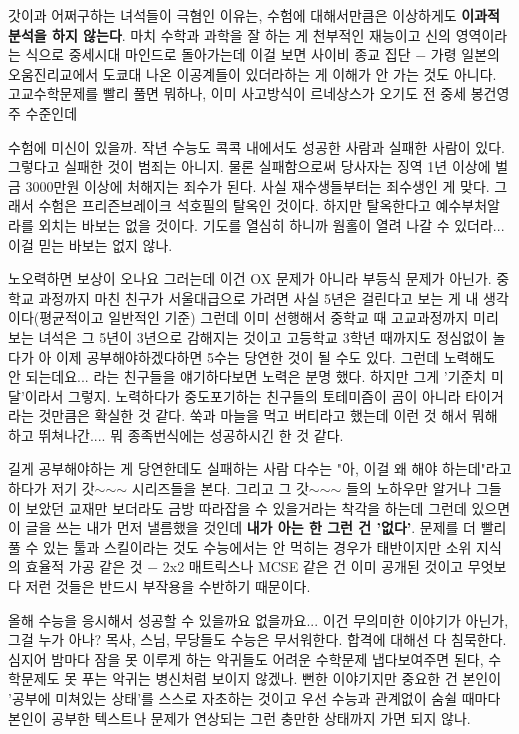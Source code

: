 갓이과 어쩌구하는 녀석들이 극혐인 이유는, 수험에 대해서만큼은 이상하게도 \textbf{이과적 분석을 하지 않는다}.
마치 수학과 과학을 잘 하는 게 천부적인 재능이고 신의 영역이라는 식으로 중세시대 마인드로 돌아가는데
이걸 보면 사이비 종교 집단 $-$ 가령 일본의 오움진리교에서 도쿄대 나온 이공계들이 있더라하는 게 이해가 안 가는 것도 아니다.
고교수학문제를 빨리 풀면 뭐하나, 이미 사고방식이 르네상스가 오기도 전 중세 봉건영주 수준인데
\vspace{5mm}

수험에 미신이 있을까.
작년 수능도 콕콕 내에서도 성공한 사람과 실패한 사람이 있다. 그렇다고 실패한 것이 범죄는 아니지.
물론 실패함으로써 당사자는 징역 1년 이상에 벌금 3000만원 이상에 처해지는 죄수가 된다.
사실 재수생들부터는 죄수생인 게 맞다. 그래서 수험은 프리즌브레이크 석호필의 탈옥인 것이다.
하지만 탈옥한다고 예수부처알라를 외치는 바보는 없을 것이다.
기도를 열심히 하니까 웜홀이 열려 나갈 수 있더라... 이걸 믿는 바보는 없지 않나.
\vspace{5mm}

노오력하면 보상이 오나요 그러는데 이건 OX 문제가 아니라 부등식 문제가 아닌가.
중학교 과정까지 마친 친구가 서울대급으로 가려면 사실 5년은 걸린다고 보는 게 내 생각이다(평균적이고 일반적인 기준)
그런데 이미 선행해서 중학교 때 고교과정까지 미리 보는 녀석은 그 5년이 3년으로 감해지는 것이고
고등학교 3학년 때까지도 정심없이 놀다가 아 이제 공부해야하겠다하면 5수는 당연한 것이 될 수도 있다.
그런데 노력해도 안 되는데요... 라는 친구들을 얘기하다보면 노력은 분명 했다. 하지만 그게 '기준치 미달'이라서 그렇지.
노력하다가 중도포기하는 친구들의 토테미즘이 곰이 아니라 타이거라는 것만큼은 확실한 것 같다.
쑥과 마늘을 먹고 버티라고 했는데 이런 것 해서 뭐해 하고 뛰쳐나간.... 뭐 종족번식에는 성공하시긴 한 것 같다.
\vspace{5mm}

길게 공부해야하는 게 당연한데도 실패하는 사람 다수는 "아, 이걸 왜 해야 하는데"라고 하다가 저기 갓$\sim$$\sim$$\sim$ 시리즈들을 본다.
그리고 그 갓$\sim$$\sim$$\sim$ 들의 노하우만 알거나 그들이 보았던 교재만 보더라도 금방 따라잡을 수 있을거라는 착각을 하는데
그런데 있으면 이 글을 쓰는 내가 먼저 낼름했을 것인데 \textbf{내가 아는 한 그런 건 '없다'}.
문제를 더 빨리 풀 수 있는 툴과 스킬이라는 것도 수능에서는 안 먹히는 경우가 태반이지만
소위 지식의 효율적 가공 같은 것 $-$ 2x2 매트릭스나 MCSE 같은 건 이미 공개된 것이고
무엇보다 저런 것들은 반드시 부작용을 수반하기 때문이다.
\vspace{5mm}

올해 수능을 응시해서 성공할 수 있을까요 없을까요... 이건 무의미한 이야기가 아닌가, 그걸 누가 아나?
목사, 스님, 무당들도 수능은 무서워한다. 합격에 대해선 다 침묵한다.
심지어 밤마다 잠을 못 이루게 하는 악귀들도 어려운 수학문제 냅다보여주면 된다, 수학문제도 못 푸는 악귀는 병신처럼 보이지 않겠나.
뻔한 이야기지만 중요한 건 본인이 '공부에 미쳐있는 상태'를 스스로 자초하는 것이고
우선 수능과 관계없이 숨쉴 때마다 본인이 공부한 텍스트나 문제가 연상되는 그런 충만한 상태까지 가면 되지 않나.
\vspace{5mm}

